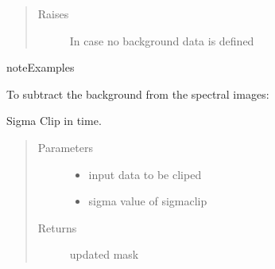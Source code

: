 \documentclass[a4paper,11pt,english]{sphinxmanual}
\begin{document}
\begin{fulllineitems}
\begin{fulllineitems}
\begin{quote}
\begin{description}
\item[{Raises}] \leavevmode
{} \textendash{} In case no background data is defined

\end{description}\end{quote}

\begin{sphinxadmonition}{note}{Examples}

To subtract the background from the spectral images:

%
\begin{sphinxVerbatim}[commandchars=\\\{\}]
\end{sphinxVerbatim}
\end{sphinxadmonition}

\end{fulllineitems}


\begin{fulllineitems}
\label{\detokenize{cascade.TSO:cascade.TSO.TSO.TSOSuite.sigma_clip_data_cosmic}}
Sigma Clip in time.
\begin{quote}\begin{description}
\item[{Parameters}] \leavevmode\begin{itemize}
\item {} 
 \textendash{} input data to be cliped

\item {} 
 \textendash{} sigma value of sigmaclip

\end{itemize}

\item[{Returns}] \leavevmode
{} \textendash{} updated mask

\end{description}\end{quote}


\end{fulllineitems}
\end{fulllineitems}
\end{document}
